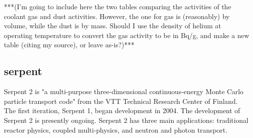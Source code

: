 ***(I'm going to include here the two tables comparing the activities of the coolant gas and dust activities.  However, the one for gas is (reasonably) by volume, while the dust is by mass.  Should I use the density of helium at operating temperature to convert the gas activity to be in Bq/g, and make a new table (citing my source), or leave as-is?)***





\subsection{serpent}
Serpent 2 is "a multi-purpose three-dimensional continuous-energy Monte Carlo particle transport code" \cite{noauthor_serpent_nodate} from the VTT Technical Research Center of Finland.  The first iteration, Serpent 1, began development in 2004.  The development of Serpent 2 is presently ongoing.  Serpent 2 has three main applications: traditional reactor physics, coupled multi-physics, and neutron and photon transport.  